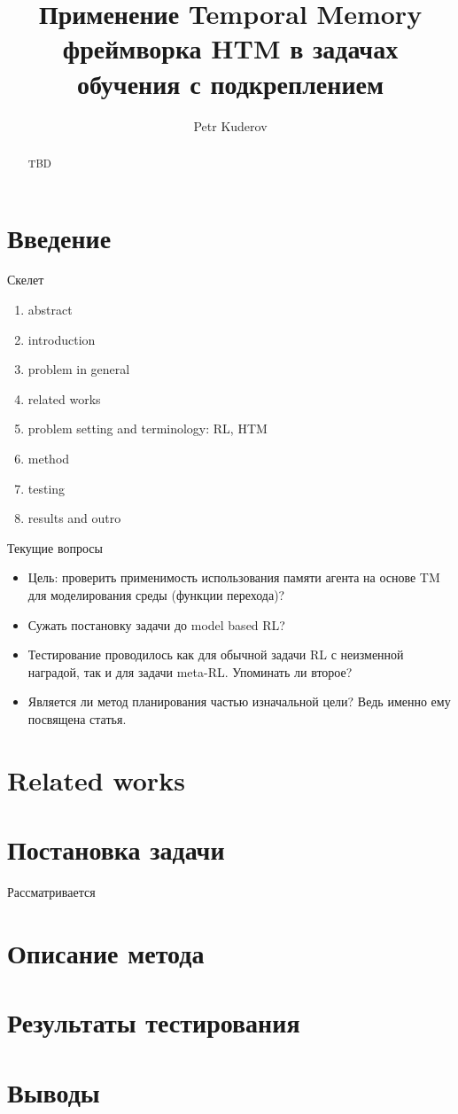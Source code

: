 \documentclass[a4paper]{article}
\begin{document}
\title {Применение Temporal Memory фреймворка HTM в задачах обучения с подкреплением}
\author {Petr Kuderov}
\maketitle

\begin{abstract}
  TBD
\end{abstract}

\section{Введение}

Скелет
\begin{enumerate}
  \item abstract
  \item introduction
  \item problem in general
  \item related works
  \item problem setting and terminology: RL, HTM
  \item method
  \item testing
  \item results and outro
\end{enumerate}

Текущие вопросы
\begin{itemize}
  \item Цель: проверить применимость использования памяти агента на основе TM для моделирования среды (функции перехода)?
  \item Сужать постановку задачи до model based RL?
  \item Тестирование проводилось как для обычной задачи RL с неизменной наградой, так и для задачи meta-RL. Упоминать ли второе?
  \item Является ли метод планирования частью изначальной цели? Ведь именно ему посвящена статья.
\end{itemize}

\section{Related works}

\section{Постановка задачи}

Рассматривается 

\section{Описание метода}

\section{Результаты тестирования}

\section{Выводы}
\end{document}
